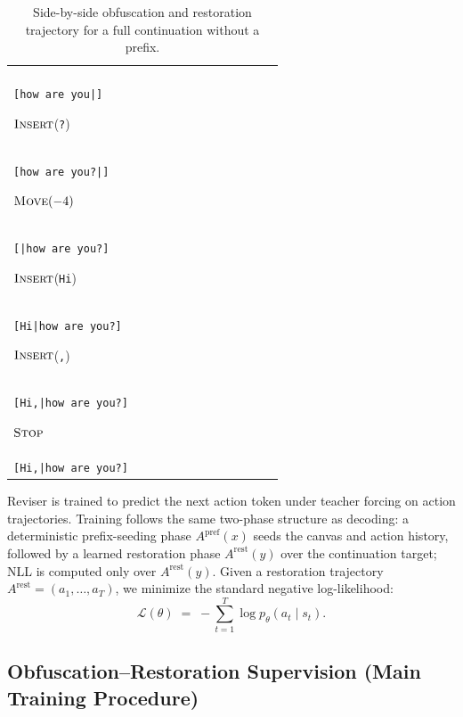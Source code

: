 \documentclass[11pt]{article}
\DeclareRobustCommand{\ph}[1]{#1}
\DeclareRobustCommand{\phA}{A}
\DeclareRobustCommand{\ph}[1]{\ifmmode\text{\phoenicianfont #1}\else{\phoenicianfont #1}\fi}
\DeclareRobustCommand{\phA}{\ph{\char"10900}} %
\DeclareRobustCommand{\ph}[1]{#1}
\DeclareRobustCommand{\phA}{A}
\DeclareRobustCommand{\Stop}{\ifmmode\text{\textsc{Stop}}\else\textsc{Stop}\fi}
\DeclareRobustCommand{\Insert}{\ifmmode\text{\textsc{Insert}}\else\textsc{Insert}\fi}
\DeclareRobustCommand{\Move}{\ifmmode\text{\textsc{Move}}\else\textsc{Move}\fi}
\begin{document}
\begin{table}[tbp]
\begin{tabular}{p{0.47\linewidth}p{0.47\linewidth}}
\begin{minipage}[t]{\linewidth}
\begin{enumerate}[leftmargin=*,itemsep=0.2em]
\item $\Insert$(\texttt{you})\\
\texttt{[how are you|]}

\item $\Insert$(\texttt{?})\\
\texttt{[how are you?|]}

\item $\Move(-4)$\\
\texttt{[|how are you?]}

\item $\Insert$(\texttt{Hi})\\
\texttt{[Hi|how are you?]}

\item $\Insert$(\texttt{,})\\
\texttt{[Hi,|how are you?]}

\item $\Stop$\\
\texttt{[Hi,|how are you?]}
\end{enumerate}
\end{minipage}
\\
\bottomrule
\end{tabular}
\caption{Side-by-side obfuscation and restoration trajectory for a full continuation without a prefix.}
\label{tab:trajectory}
\end{table}

Reviser is trained to predict the next action token under teacher forcing on action trajectories. Training follows the same two-phase structure as decoding: a deterministic prefix-seeding phase $\phA^{\text{pref}}(x)$ seeds the canvas and action history, followed by a learned restoration phase $\phA^{\text{rest}}(y)$ over the continuation target; NLL is computed only over $\phA^{\text{rest}}(y)$. Given a restoration trajectory $\phA^{\text{rest}} = (a_1, \dots, a_T)$, we minimize the standard negative log-likelihood:
\[
\mathcal{L}(\theta) \;=\; -\sum_{t=1}^{T} \log p_\theta(a_t \mid s_t).
\]

\subsection{Obfuscation--Restoration Supervision (Main Training Procedure)}
\label{sec:obf_restoration}
\end{document}
